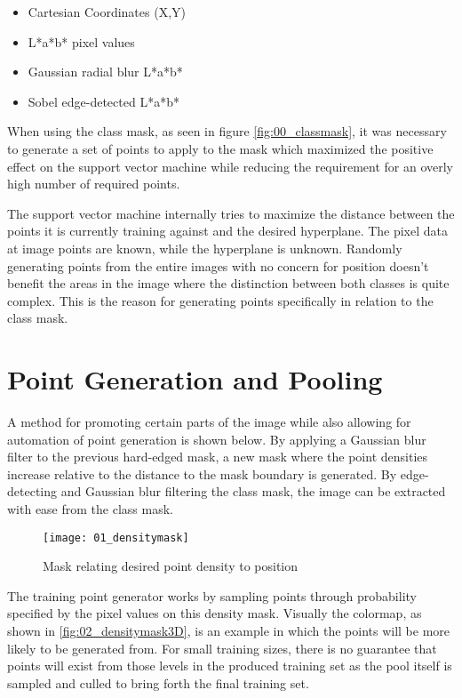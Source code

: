 \begin{itemize}
    \item Cartesian Coordinates (X,Y)
    \item L*a*b* pixel values
    \item Gaussian radial blur L*a*b*
    \item Sobel edge-detected L*a*b*
\end{itemize}

When using the class mask, as seen in figure \ref{fig:00_classmask}, it was necessary to generate a set of points to apply to the mask which maximized the positive effect on the support vector machine while reducing the requirement for an overly high number of required points. 

The support vector machine internally tries to maximize the distance between the points it is currently training against and the desired hyperplane\citep{SH_hyperplane0}. The pixel data at image points are known, while the hyperplane is unknown. Randomly generating points from the entire images with no concern for position doesn't benefit the areas in the image where the distinction between both classes is quite complex. This is the reason for generating points specifically in relation to the class mask. 

\section{Point Generation and Pooling}

A method for promoting certain parts of the image while also allowing for automation of point generation is shown below. By applying a Gaussian blur filter to the previous hard-edged mask, a new mask where the point densities increase relative to the distance to the mask boundary is generated. By edge-detecting and Gaussian blur filtering the class mask, the image can be extracted with ease from the class mask.

\begin{figure}[ht]
    \centering
    \texttt{[image: 01\_densitymask]}
    \caption{Mask relating desired point density to position}
    \label{fig:01_densitymask}
\end{figure}

The training point generator works by sampling points through probability specified by the pixel values on this density mask. Visually the colormap, as shown in \ref{fig:02_densitymask3D}, is an example in which the points will be more likely to be generated from. For small training sizes, there is no guarantee that points will exist from those levels in the produced training set as the pool itself is sampled and culled to bring forth the final training set.

